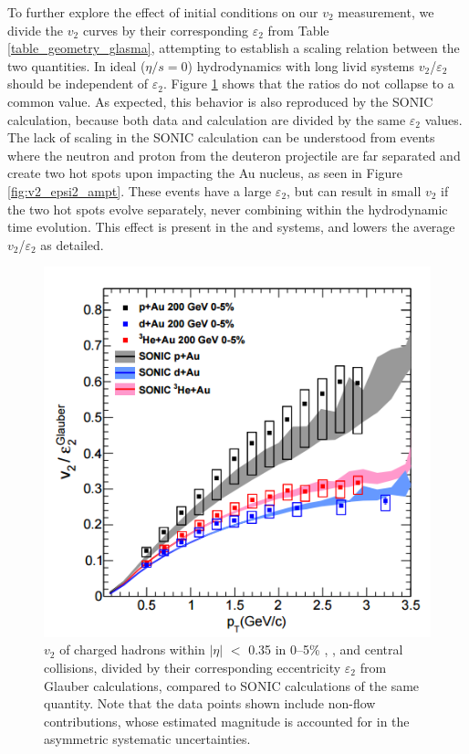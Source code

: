 To further explore the effect of initial conditions on our $v_2$ measurement, we divide the $v_2$ curves by their corresponding $\varepsilon_2$ from Table \ref{table_geometry_glasma}, attempting to establish  a scaling relation between the two quantities. In ideal ($\eta/s=0$) hydrodynamics with long livid systems $v_2$/$\varepsilon_2$ should be independent of $\varepsilon_2$. Figure \ref{fig:v2_divided_epsilon_all_sys} shows that the ratios do not collapse to a common value. As expected, this behavior is also reproduced by the SONIC calculation, because both data and calculation are divided by the same $\varepsilon_2$ values. The lack of scaling in the SONIC calculation can be understood from \dau events where the neutron and proton from the deuteron projectile are far separated and create two hot spots upon impacting the Au nucleus, as seen in Figure \ref{fig:v2_epsi2_ampt}. These events have a large $\varepsilon_2$, but can result in small $v_2$ if the two hot spots evolve separately, never combining within the hydrodynamic time evolution. This effect is present in the \dau and \hau systems, and lowers the average $v_2$/$\varepsilon_2$ as detailed.%

\begin{figure}[!ht]
\begin{center}
\includegraphics[width=0.65\linewidth]{figs/v2_divided_epsilon_all_sys.PNG}
\caption{$v_2$ of charged hadrons within $|\eta|$ $<$ 0.35 in 0--5\% \pau,  \dau, and \hau central collisions, divided by their corresponding eccentricity $\varepsilon_2$ from Glauber calculations, compared to SONIC calculations of the same quantity. Note that the data points shown include non-flow contributions, whose estimated magnitude is accounted for in the asymmetric systematic uncertainties.}
\label{fig:v2_divided_epsilon_all_sys}
\end{center}
\end{figure}

